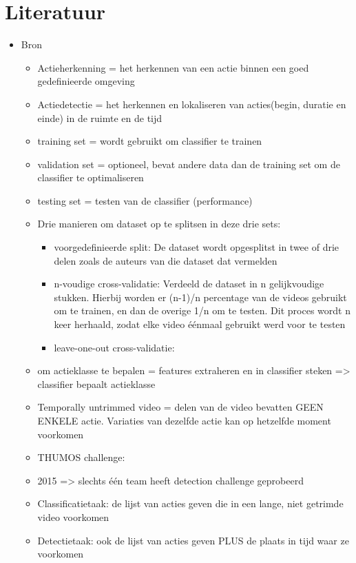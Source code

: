 \chapter{Literatuur}

\begin{itemize}
		\item Bron \cite{Review-of-Action-Recognition-and-Detection-Methods}
	\begin{itemize}
		\item Actieherkenning = het herkennen van een actie binnen een goed gedefinieerde omgeving 
		\item Actiedetectie = het herkennen en lokaliseren van acties(begin, duratie en einde) in de ruimte en de tijd
		\item training set = wordt gebruikt om classifier te trainen
		\item validation set = optioneel, bevat andere data dan de training set om de classifier te optimaliseren
		\item testing set = testen van de classifier (performance)
		\item Drie manieren om dataset op te splitsen in deze drie sets:
		\begin{itemize}
			\item voorgedefinieerde split: De dataset wordt opgesplitst  in twee of drie delen zoals de auteurs van die dataset dat vermelden
			\item n-voudige cross-validatie: Verdeeld de dataset in n gelijkvoudige stukken. Hierbij worden er (n-1)/n  percentage van de videos gebruikt om te trainen, en dan de overige 1/n om te testen. Dit proces wordt n keer herhaald, zodat elke video éénmaal gebruikt werd voor te testen
			\item leave-one-out cross-validatie:
		\end{itemize}
		
		
		\item  om actieklasse te bepalen = features extraheren en in classifier steken => classifier bepaalt actieklasse
		\item Temporally untrimmed video = delen van de video bevatten GEEN ENKELE actie. Variaties van dezelfde actie kan op hetzelfde moment voorkomen
		
		\item THUMOS challenge:
		\item 2015 => slechts één team heeft detection challenge geprobeerd
		
		\item 	Classificatietaak: de lijst van acties geven die in een lange, niet getrimde video voorkomen
		\item 	Detectietaak: ook de lijst van acties geven PLUS de plaats in tijd waar ze voorkomen
	\end{itemize}


\end{itemize}
